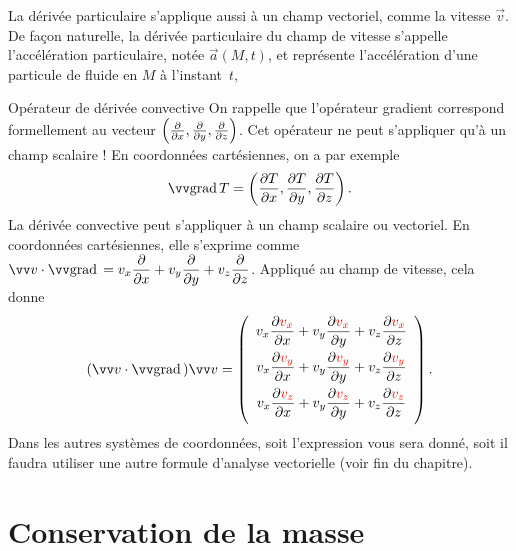 \documentclass[12pt,fancy]{cours}
\begin{document}
 La dérivée particulaire s'applique aussi à un champ vectoriel, comme la vitesse $\Vec{v}$. De façon naturelle, la dérivée particulaire du champ de vitesse s'appelle l'accélération particulaire, notée $\Vec{a}(M,t)$, et représente l'accélération d'une particule de fluide en $M$ à l'instant~$t$,
\begin{rappel}{Opérateur de dérivée convective}
On rappelle que l'opérateur gradient correspond formellement au vecteur $\left(\frac{\partial{}}{\partial{x}},\frac{\partial{}}{\partial{y}},\frac{\partial{}}{\partial{z}}\right)$. Cet opérateur ne peut s'appliquer qu'à un champ scalaire ! En coordonnées cartésiennes, on a par exemple
\begin{equation}
\Grad{T} = \left(\dr{T}{x},\dr{T}{y},\dr{T}{z}\right).
\end{equation}
La dérivée convective peut s'appliquer à un champ scalaire ou vectoriel. En coordonnées cartésiennes, elle s'exprime comme
$
\Vec{v}\cdot\Grad{} =
v_{x}\dfrac{\partial}{\partial x} + v_{y}\dfrac{\partial}{\partial y} + v_{z}\dfrac{\partial}{\partial z}
$. Appliqué au champ de vitesse, cela donne
\begin{equation}
(\Vec{v}\cdot\Grad)\Vec{v}=
\left(\begin{array}{ccc}
v_{x}\dfrac{\partial \JRouge{v_{x}}}{\partial x}+v_{y}\dfrac{\partial \JRouge{v_{x}}}{\partial y}+v_{z}\dfrac{\partial \JRouge{v_{x}}}{\partial z} \\ [3mm]
v_{x}\dfrac{\partial \JRouge{v_{y}}}{\partial x}+v_{y}\dfrac{\partial \JRouge{v_{y}}}{\partial y}+v_{z}\dfrac{\partial \JRouge{v_{y}}}{\partial z} \\ [3mm]
v_{x}\dfrac{\partial \JRouge{v_{z}}}{\partial x}+v_{y}\dfrac{\partial \JRouge{v_{z}}}{\partial y}+v_{z}\dfrac{\partial \JRouge{v_{z}}}{\partial z} \\  [3mm]
\end{array}\right).
\end{equation}
Dans les autres systèmes de coordonnées, soit l'expression vous sera donné, soit il faudra utiliser une autre formule d'analyse vectorielle (voir fin du chapitre).
\end{rappel}


\section{Conservation de la masse}
\end{document}
